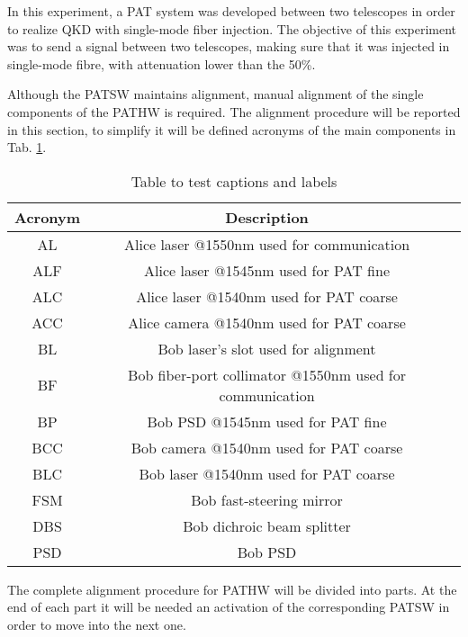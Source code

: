 In this experiment, a PAT system was developed between two telescopes in order to realize QKD with single-mode fiber injection.
The objective of this experiment was to send a signal between two telescopes, making sure that it was injected in single-mode fibre, with attenuation lower than the 50\%.

Although the PATSW maintains alignment, manual alignment of the single components of the PATHW is required. The alignment procedure will be reported in this section, to simplify it will be defined acronyms of the main components in Tab. \ref{table:1}.

\begin{table}[h!]
  \centering
  \begin{tabular}{ |c|c|c| }
    \hline
    Acronym & Description                                              \\
    \hline
    AL      & Alice laser @1550nm used for communication               \\
    ALF     & Alice laser @1545nm used for PAT fine                    \\
    ALC     & Alice laser @1540nm used for PAT coarse                  \\
    ACC     & Alice camera @1540nm used for PAT coarse                 \\
    \hline
    BL      & Bob laser's slot used for alignment                      \\
    BF      & Bob fiber-port collimator @1550nm used for communication \\
    BP      & Bob PSD @1545nm used for PAT fine                        \\
    BCC     & Bob camera @1540nm used for PAT coarse                   \\
    BLC     & Bob laser @1540nm used for PAT coarse                    \\
    FSM     & Bob fast-steering mirror                                 \\
    DBS     & Bob dichroic beam splitter                               \\
    PSD     & Bob PSD                                                  \\
    \hline
  \end{tabular}
  \caption{Table to test captions and labels}
  \label{table:1}
\end{table}
The complete alignment procedure for PATHW will be divided into parts. At the end of each part it will be needed an activation of the corresponding PATSW in order to move into the next one.

